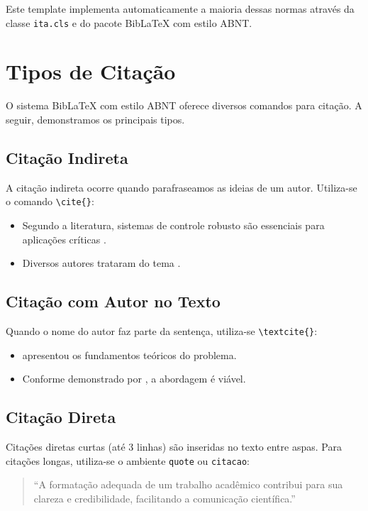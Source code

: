 Este template implementa automaticamente a maioria dessas normas através da classe \texttt{ita.cls} e do pacote Bib\LaTeX{} com estilo ABNT.

\section{Tipos de Citação}

O sistema Bib\LaTeX{} com estilo ABNT oferece diversos comandos para citação. A seguir, demonstramos os principais tipos.

\subsection{Citação Indireta}

A citação indireta ocorre quando parafraseamos as ideias de um autor. Utiliza-se o comando \texttt{\textbackslash cite\{\}}:

\begin{itemize}
    \item Segundo a literatura, sistemas de controle robusto são essenciais para aplicações críticas \cite{Sbornian2004}.
    \item Diversos autores trataram do tema \cite{Sbornian2004, Joea2003}.
\end{itemize}

\subsection{Citação com Autor no Texto}

Quando o nome do autor faz parte da sentença, utiliza-se \texttt{\textbackslash textcite\{\}}:

\begin{itemize}
    \item \textcite{Nascimento1970} apresentou os fundamentos teóricos do problema.
    \item Conforme demonstrado por \textcite{Sbornian2004}, a abordagem é viável.
\end{itemize}

\subsection{Citação Direta}

Citações diretas curtas (até 3 linhas) são inseridas no texto entre aspas. Para citações longas, utiliza-se o ambiente \texttt{quote} ou \texttt{citacao}:

\begin{quote}
``A formatação adequada de um trabalho acadêmico contribui para sua clareza e credibilidade, facilitando a comunicação científica.''
\end{quote}


